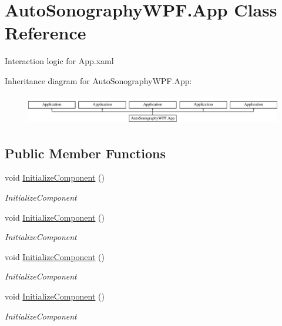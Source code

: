 \hypertarget{class_auto_sonography_w_p_f_1_1_app}{}\section{Auto\+Sonography\+W\+P\+F.\+App Class Reference}
\label{class_auto_sonography_w_p_f_1_1_app}


Interaction logic for App.\+xaml  


Inheritance diagram for Auto\+Sonography\+W\+P\+F.\+App\+:\begin{figure}[H]
\begin{center}
\leavevmode
\includegraphics[height=1.325444cm]{class_auto_sonography_w_p_f_1_1_app}
\end{center}
\end{figure}
\subsection*{Public Member Functions}
\begin{DoxyCompactItemize}
\item 
void \hyperlink{class_auto_sonography_w_p_f_1_1_app_a5878d4ccc5b6d4f1343b839cfa9babbb}{Initialize\+Component} ()
\begin{DoxyCompactList}\small\item\em Initialize\+Component \end{DoxyCompactList}\item 
void \hyperlink{class_auto_sonography_w_p_f_1_1_app_a5878d4ccc5b6d4f1343b839cfa9babbb}{Initialize\+Component} ()
\begin{DoxyCompactList}\small\item\em Initialize\+Component \end{DoxyCompactList}\item 
void \hyperlink{class_auto_sonography_w_p_f_1_1_app_a5878d4ccc5b6d4f1343b839cfa9babbb}{Initialize\+Component} ()
\begin{DoxyCompactList}\small\item\em Initialize\+Component \end{DoxyCompactList}\item 
void \hyperlink{class_auto_sonography_w_p_f_1_1_app_a5878d4ccc5b6d4f1343b839cfa9babbb}{Initialize\+Component} ()
\begin{DoxyCompactList}\small\item\em Initialize\+Component \end{DoxyCompactList}\end{DoxyCompactItemize}
